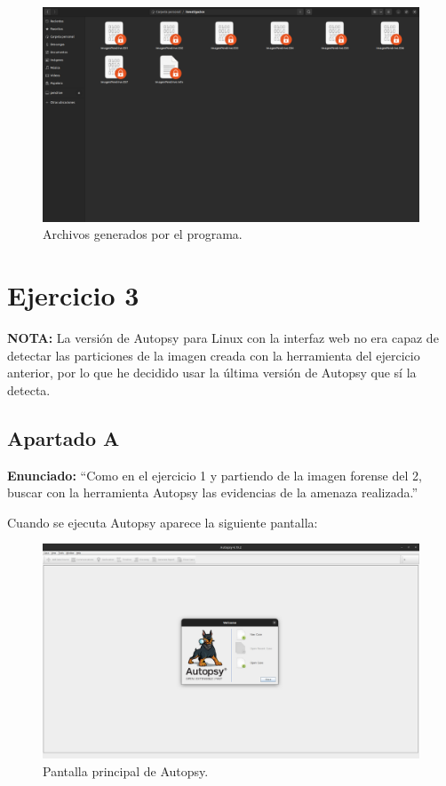 \documentclass{article}
\begin{document}
\begin{figure}[H]
    \centering
    \includegraphics[width=\textwidth]{imagenes/Captura desde 2022-12-02 19-50-53.png}
    \caption{Archivos generados por el programa.}
\end{figure}

\newpage

{}
\section*{Ejercicio 3}

\textbf{NOTA: }La versión de Autopsy para Linux con la interfaz web no era capaz de detectar las particiones de la imagen creada con la herramienta del ejercicio anterior, por lo que he decidido usar la última versión de Autopsy que sí la detecta.


{}
\subsection*{Apartado A}

\textbf{Enunciado: } ``Como en el ejercicio 1 y partiendo de la imagen forense del 2, buscar con la herramienta Autopsy las evidencias de la amenaza realizada.''

\bigskip

Cuando se ejecuta Autopsy aparece la siguiente pantalla:

\begin{figure}[H]
    \centering
    \includegraphics[width=\textwidth]{imagenes/Captura desde 2022-12-03 21-22-16.png}
    \caption{Pantalla principal de Autopsy.}
\end{figure}
\end{document}
